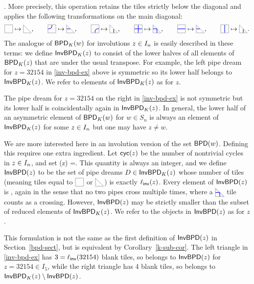 \documentclass[10pt]{article}
\begin{document}
.
\ee
More precisely, this operation retains the tiles strictly below the diagonal
and applies the following transformations on the main diagonal:
\[
\BTILE \mapsto \BDIAG,\qquad
\JTILE \mapsto\JDIAG, \qquad
\CTILE \mapsto\CDIAG,\qquad
\PTILE \mapsto\PDIAG,\qquad
\HTILE\mapsto\JDIAG,\qquad
\VTILE\mapsto\CDIAG
.\]
The analogue of $\mathsf{BPD}_K(w)$ for involutions $z \in I_n$
is easily described in these terms:
we define $\mathsf{InvBPD}_K(z)$ to consist of the lower halves of all elements of $\mathsf{BPD}_K(z)$
that are  under the usual transpose.
For example, the left pipe dream for $z=32154$ in \eqref{inv-bpd-ex} above is symmetric so its lower half belongs to $\mathsf{InvBPD}_K(z)$.
We refer to elements of $\mathsf{InvBPD}_K(z)$ as  for $z$.

\begin{remark}
The pipe dream for $z=32154$ on the right in \eqref{inv-bpd-ex} 
is not symmetric but its lower half is coincidentally again in $\mathsf{InvBPD}_K(z)$. In general, the lower half 
of an asymmetric element of $\mathsf{BPD}_K(w)$ for $w \in S_n$ is always an element of  $\mathsf{InvBPD}_K(z)$
for some $z\in I_n$ but one may have $z\neq w$.
\end{remark}


We are more interested here in an involution version of the set $\mathsf{BPD}(w)$.
Defining this requires one extra ingredient.
Let $\textsf{cyc}(z)$ be the number of nontrivial cycles in $z\in I_n$,
and set \be\ellinv(z)  =.\ee
This quantity is always an integer, and 
we define $\mathsf{InvBPD}(z)$ to be the set of pipe dreams $D \in \mathsf{InvBPD}_K(z)$
whose number of  tiles (meaning tiles equal to $\BTILE$ or $\BDIAG$) is exactly $\ell_{\mathsf{inv}}(z)$.
Every element of $\mathsf{InvBPD}(z)$  is , again in the sense that no two pipes cross multiple times, where a $\PDIAG$ tile counts as a crossing. However,
$\mathsf{InvBPD}(z)$ may be strictly smaller than the subset of
reduced elements of $\mathsf{InvBPD}_K(z)$.
We refer to the objects in $\mathsf{InvBPD}(z)$ as  for $z$.

\begin{remark}
This formulation is not the same as the first definition of $\mathsf{InvBPD}(z)$ in Section~\ref{bpd-sect},
but is equivalent by Corollary~\ref{k-sub-cor}.
The left triangle  in 
 \eqref{inv-bpd-ex} has $3 = \ell_{\mathsf{inv}}(32154)$ blank tiles, so belongs to
 $\mathsf{InvBPD}(z)$ for $z=32154 \in I_5$, 
 while the right triangle has 4 blank tiles, so belongs to
$\mathsf{InvBPD}_K(z)\setminus\mathsf{InvBPD}(z)$.
\end{remark}
\end{document}
